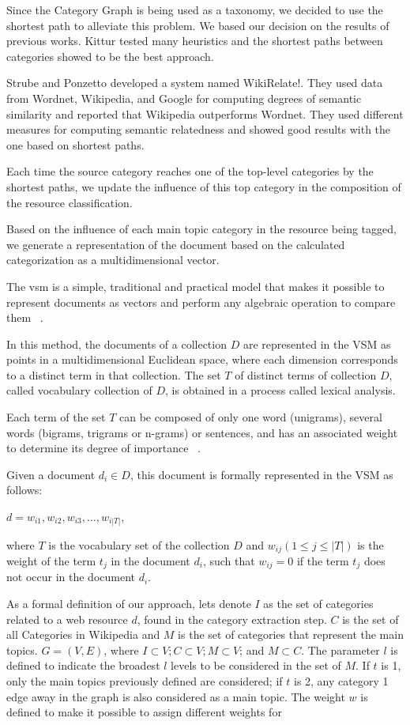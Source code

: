 Since the Category Graph is being used as a taxonomy, we decided to use the shortest path to alleviate this problem. We based our decision on the results of previous works. Kittur\cite{knuth:84} tested many heuristics and the shortest paths between categories showed to be the best approach. 

Strube and Ponzetto\cite{strube2006wikirelate} developed a system named WikiRelate!. They used data from Wordnet, Wikipedia, and Google for computing degrees of semantic similarity and reported that Wikipedia outperforms Wordnet.  They used different measures for computing semantic relatedness and showed good results with the one based on shortest paths.

Each time the source category reaches one of the top-level categories by the shortest paths, we update the influence of this top category in the composition of the resource classification.

Based on the influence of each main topic category in the resource being tagged, we generate a representation of the document based on the calculated categorization as a multidimensional vector.

The \gls{vsm} is a simple, traditional and practical model that makes it possible to represent documents as vectors and perform any algebraic operation to compare them ~\cite{salton1988term}.

In this method, the documents of a collection $D$ are represented in the VSM as points in a multidimensional Euclidean space, where each dimension corresponds to a distinct term in that collection. The set $T$ of distinct terms of collection $D$, called vocabulary collection of $D$, is obtained in a process called lexical analysis.

Each term of the set $T$ can be composed of only one word (unigrams), several words (bigrams, trigrams or n-grams) or sentences, and has an associated weight to determine its degree of importance ~\cite{salton1988term}.

Given a document $d_i \in D$, this document is formally represented in the VSM as follows:

$d={w_{i1},w_{i2},w_{i3},\ldots,w_{i|T|}}$,

where $T$ is the vocabulary set of the collection $D$ and $w_{ij} (1 \le j \le |T|)$ is the weight of the term $t_j$ in the document $d_i$, such that $w_{ij} = 0$ if the term $t_j$ does not occur in the document $d_i$.

As a formal definition of our approach, lets denote $I$ as the set of categories related to a web resource $d$, found in the category extraction step. $C$ is the set of all Categories in Wikipedia and $M$ is the set of categories that represent the main topics. $G = (V,E)$, where $I \subset V ; C \subset V ; M \subset V$; and $M \subset C$.  The parameter  $l$ is defined to indicate the broadest $l$ levels to be considered in the set of $M$. If $t$ is 1, only the main topics previously defined are considered; if $t$ is 2, any category 1 edge away in the graph is also considered as a main topic. The weight $w$ is defined to make it possible to assign different weights for 

